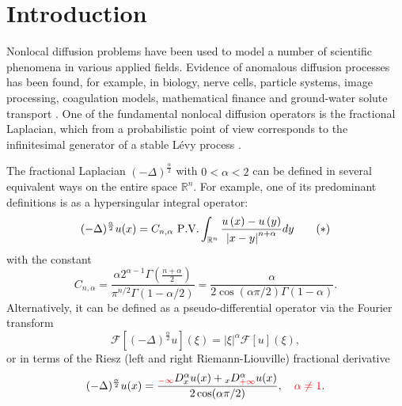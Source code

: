 \documentclass[smallextended]{svjour3}       %
\newcommand{\tcr}[1]{\textcolor{red}{#1}}
\begin{document}
\section{Introduction}\label{Se:intro}
	Nonlocal diffusion problems have been used to model a number of scientific phenomena in various applied fields. Evidence of anomalous diffusion processes has been found,  for example, in biology, nerve cells, particle systems, image processing, coagulation models, mathematical finance and ground-water solute transport \cite{Andreu:10}.
One of the fundamental nonlocal diffusion operators is the fractional Laplacian,
which from a probabilistic point of view corresponds to the infinitesimal generator of a stable L\'{e}vy process \cite{ABBM2018,Bertoin:96,Getoor1961}.
	
	
 The fractional Laplacian $\left(-\Delta\right)^{\frac{\alpha}{2}}$ with $0<\alpha<2$ can be defined in several equivalent ways \cite{Kwa:17} on the entire space $ \mathbb{R}^n$. For example, 
 one of its predominant  definitions is as a hypersingular integral operator: 	
\begin{gather*}
(-\Delta)^{\frac{\alpha}{2}} u(x)=C_{n,\alpha} \,\,{\rm P.V.} \int_{\mathbb{R}^n}
		{\frac{u\left( x \right) -u\left( y \right)}{\left| x-y \right|^{n+\alpha}}dy} \tag{$*$}
\end{gather*}
with the constant
\[
C_{n,\alpha}=\frac{\alpha2^{\alpha-1}\Gamma\left(\frac{n+\alpha}{2}\right)}{\pi^{n/2}\Gamma(1-\alpha/2)}
 	= \frac{\alpha}{2\cos(\alpha\pi/2)\Gamma(1-\alpha)}.
\]
Alternatively, it can be defined  as a pseudo-differential operator  via the Fourier transform 
\[\mathcal{F}[\left(-\Delta\right)^{\frac{\alpha}{2}}u](\xi)=|\xi|^\alpha\mathcal{F}[u](\xi),\]
or in terms of the Riesz (left and right Riemann-Liouville) fractional derivative 
\[(-\Delta)^{\frac{\alpha}{2}} u(x)=\frac{{_{\tcr{-\infty}}}D_x^\alpha u(x)+{_x}D_{\tcr{+\infty}}^\alpha u(x)}{2\cos(\alpha \pi/2)},~~~\tcr{\alpha\neq 1 }.\]
\end{document}
